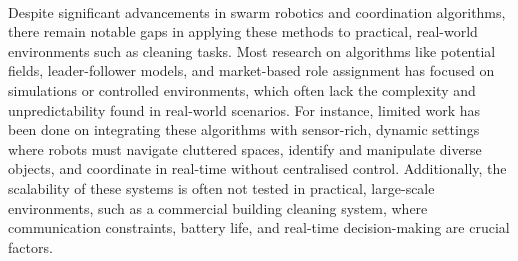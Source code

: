 \paragraph*{}
Despite significant advancements in swarm robotics and coordination algorithms, there remain notable gaps in applying these methods to practical, real-world environments such as cleaning tasks. Most research on algorithms like potential fields, leader-follower models, and market-based role assignment has focused on simulations or controlled environments, which often lack the complexity and unpredictability found in real-world scenarios. For instance, limited work has been done on integrating these algorithms with sensor-rich, dynamic settings where robots must navigate cluttered spaces, identify and manipulate diverse objects, and coordinate in real-time without centralised control. Additionally, the scalability of these systems is often not tested in practical, large-scale environments, such as a commercial building cleaning system, where communication constraints, battery life, and real-time decision-making are crucial factors.